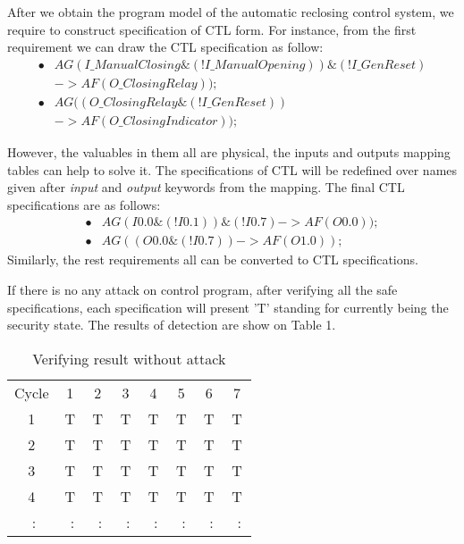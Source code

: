 After we obtain the program model of the automatic reclosing control system, we require to construct specification of CTL form. For instance, from the first requirement we can draw the CTL specification as follow:\[\begin{split}
\bullet &AG(I\_ManualClosing\&(! I\_ManualOpening) )\&(! I\_GenReset) \\&-> AF(O\_ ClosingRelay));\\\bullet &AG((O\_ ClosingRelay \& (! I\_GenReset)) \\&-> AF(O\_ClosingIndicator));
\end{split}
\]

However, the valuables in them all are physical, the inputs and outputs mapping tables can help to solve it. The specifications of CTL will be redefined over names given after \textit{input} and \textit{output} keywords from the mapping. The final CTL specifications are as follows:
\[\begin{split}
\bullet &AG(I0.0\&(! I0.1) )\&(! I0.7) -> AF(O0.0));\\\bullet &AG((O0.0 \& (! I0.7)) -> AF(O1.0));
\end{split}
\]
Similarly, the rest requirements all can be converted to CTL specifications.

If there is no any attack on control program, after verifying all the safe specifications, each specification will present 'T' standing for currently being the security state. The results of detection are show on Table 1.

\begin{table}[!htb]
\centering
\begin{tabular}{cccccccc}

\hline
Cycle & 1 & 2 & 3 & 4 & 5 & 6 & 7\\

1 & T & T & T & T & T & T & T\\

2 & T & T & T & T & T & T & T\\

3 & T & T & T & T & T & T & T\\

4 & T & T & T & T & T & T & T\\

~$\colon$ & ~$\colon$ & ~$\colon$ & ~$\colon$ & ~$\colon$ & ~$\colon$ & ~$\colon$ & ~$\colon$\\
\hline
\end{tabular}
\caption{Verifying result without attack}
\end{table} 

